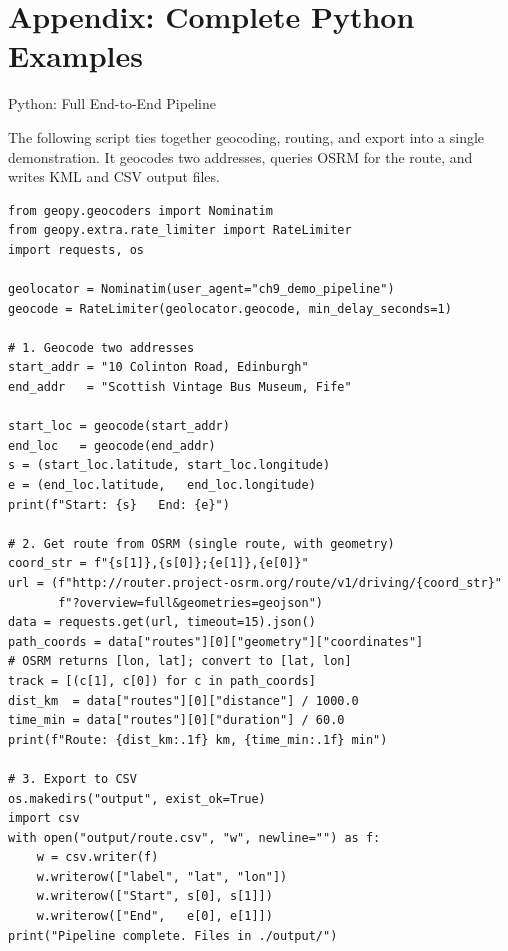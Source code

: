 \documentclass[aspectratio=169,10pt]{beamer}
\begin{document}
\appendix
\section*{Appendix: Complete Python Examples}

\begin{frame}[fragile]{Python: Full End-to-End Pipeline}

  The following script ties together geocoding, routing, and export into a
  single demonstration.  It geocodes two addresses, queries OSRM for the
  route, and writes KML and CSV output files.

\begin{lstlisting}[style=pycode, caption={End-to-end: geocode + route + export}]
from geopy.geocoders import Nominatim
from geopy.extra.rate_limiter import RateLimiter
import requests, os

geolocator = Nominatim(user_agent="ch9_demo_pipeline")
geocode = RateLimiter(geolocator.geocode, min_delay_seconds=1)

# 1. Geocode two addresses
start_addr = "10 Colinton Road, Edinburgh"
end_addr   = "Scottish Vintage Bus Museum, Fife"

start_loc = geocode(start_addr)
end_loc   = geocode(end_addr)
s = (start_loc.latitude, start_loc.longitude)
e = (end_loc.latitude,   end_loc.longitude)
print(f"Start: {s}   End: {e}")

# 2. Get route from OSRM (single route, with geometry)
coord_str = f"{s[1]},{s[0]};{e[1]},{e[0]}"
url = (f"http://router.project-osrm.org/route/v1/driving/{coord_str}"
       f"?overview=full&geometries=geojson")
data = requests.get(url, timeout=15).json()
path_coords = data["routes"][0]["geometry"]["coordinates"]
# OSRM returns [lon, lat]; convert to [lat, lon]
track = [(c[1], c[0]) for c in path_coords]
dist_km  = data["routes"][0]["distance"] / 1000.0
time_min = data["routes"][0]["duration"] / 60.0
print(f"Route: {dist_km:.1f} km, {time_min:.1f} min")

# 3. Export to CSV
os.makedirs("output", exist_ok=True)
import csv
with open("output/route.csv", "w", newline="") as f:
    w = csv.writer(f)
    w.writerow(["label", "lat", "lon"])
    w.writerow(["Start", s[0], s[1]])
    w.writerow(["End",   e[0], e[1]])
print("Pipeline complete. Files in ./output/")
\end{lstlisting}

\end{frame}
\end{document}
